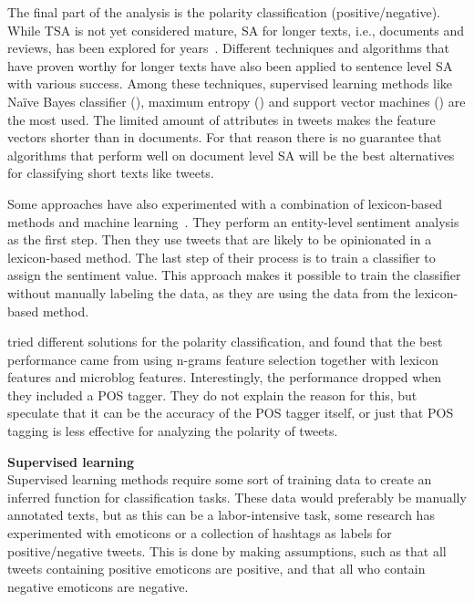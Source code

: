 The final part of the analysis is the polarity classification (positive/negative). While TSA is not yet considered mature, SA for longer texts, i.e., documents and reviews, has been explored for years~\citep{book:pang}. Different techniques and algorithms that have proven worthy for longer texts have also been applied to sentence level SA with various success. Among these techniques, supervised learning methods like Na\"{i}ve Bayes classifier (), maximum entropy () and support vector machines () are the most used. The limited amount of attributes in tweets makes the feature vectors shorter than in documents. For that reason there is no guarantee that algorithms that perform well on document level SA will be the best alternatives for classifying short texts like tweets.

Some approaches have also experimented with a combination of lexicon-based methods and  machine learning~\citep{article:mudinas}. They perform an entity-level sentiment analysis as the first step. Then they use tweets that are likely to be opinionated in a lexicon-based method. The last step of their process is to train a classifier to assign the sentiment value. This approach makes it possible to train the classifier without manually labeling the data, as they are using the data from the lexicon-based method.

\cite{article:omg} tried different solutions for the polarity classification, and found that the best performance came from using n-grams feature selection together with lexicon features and microblog features. Interestingly, the performance dropped when they included a POS tagger. They do not explain the reason for this, but speculate that it can be the accuracy of the POS tagger itself, or just that POS tagging is less effective for analyzing the polarity of tweets.\vspace{8mm}

\noindent
\textbf{Supervised learning} \\
\noindent
Supervised learning methods require some sort of training data to create an inferred function for classification tasks. These data would preferably be manually annotated texts, but as this can be a labor-intensive task, some research has experimented with emoticons or a collection of hashtags as labels for positive/negative tweets. This is done by making assumptions, such as that all tweets containing positive emoticons are positive, and that all who contain negative emoticons are negative.

